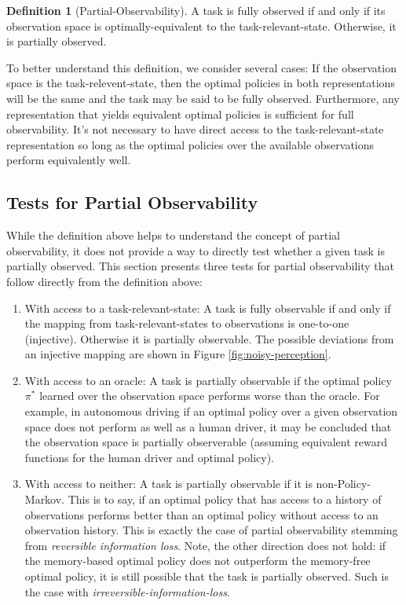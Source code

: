 \documentclass{article} %
\theoremstyle{definition}
\newtheorem{definition}{Definition}[section]
\begin{document}
\begin{definition}[Partial-Observability]
\label{def:PO}
A task is fully observed if and only if its observation space is
optimally-equivalent to the task-relevant-state. Otherwise, it is
partially observed.
\end{definition}

To better understand this definition, we consider several cases: If
the observation space is the task-relevent-state, then the optimal
policies in both representations will be the same and the task may be
said to be fully observed. Furthermore, any representation that yields
equivalent optimal policies is sufficient for full observability. It's
not necessary to have direct access to the task-relevant-state
representation so long as the optimal policies over the available
observations perform equivalently well.

\subsection{Tests for Partial Observability}
While the definition above helps to understand the concept of partial
observability, it does not provide a way to directly test whether a
given task is partially observed. This section presents three tests
for partial observability that follow directly from the definition
above:

\begin{enumerate}
\item With access to a task-relevant-state: A task is fully observable
  if and only if the mapping from task-relevant-states to observations
  is one-to-one (injective). Otherwise it is partially observable. The
  possible deviations from an injective mapping are shown in Figure
  \ref{fig:noisy-perception}.
\item With access to an oracle: A task is partially observable if the
  optimal policy $\pi^*$ learned over the observation space performs
  worse than the oracle. For example, in autonomous driving if an
  optimal policy over a given observation space does not perform as
  well as a human driver, it may be concluded that the observation
  space is partially observerable (assuming equivalent reward
  functions for the human driver and optimal policy).
\item With access to neither: A task is partially observable if it is
  non-Policy-Markov. This is to say, if an optimal policy that has
  access to a history of observations performs better than an optimal
  policy without access to an observation history. This is exactly the
  case of partial observability stemming from \textit{reversible
    information loss}. Note, the other direction does not hold: if the
  memory-based optimal policy does not outperform the memory-free
  optimal policy, it is still possible that the task is partially
  observed. Such is the case with
  \textit{irreversible-information-loss}.
\end{enumerate}
\end{document}
